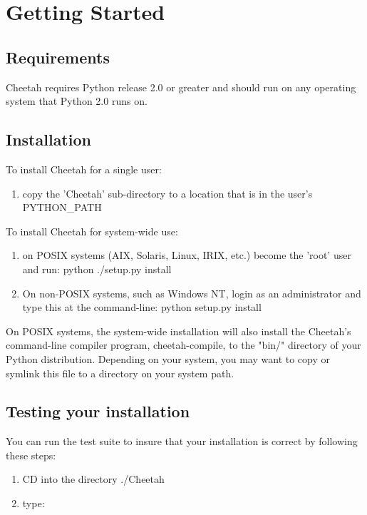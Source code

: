 \section{Getting Started}
\label{gettingStarted}

\subsection{Requirements}
Cheetah requires Python release 2.0 or greater and should run on any
operating system that Python 2.0 runs on.

\subsection{Installation}

To install Cheetah for a single user:
\begin{enumerate}
\item copy the 'Cheetah' sub-directory  to a location that is in the user's
     PYTHON_PATH
\end{enumerate}

To install Cheetah for system-wide use:
\begin{enumerate}
\item on POSIX systems (AIX, Solaris, Linux, IRIX, etc.) become the 'root' user
     and run: python ./setup.py install
     
\item On non-POSIX systems, such as Windows NT, login as an administrator and
     type this at the command-line:  python setup.py install
\end{enumerate}


On POSIX systems, the system-wide installation will also install the Cheetah's
command-line compiler program, cheetah-compile, to the "bin/" directory of your
Python distribution.  Depending on your system, you may want to copy or symlink
this file to a directory on your system path.

\subsection{Testing your installation}
You can run the test suite to insure that your installation is correct by
following these steps:
\begin{enumerate}
\item CD into the directory ./Cheetah   
\item type:  
\end{enumerate}

